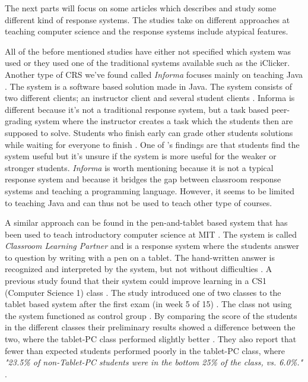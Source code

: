 The next parts will focus on some articles which describes and study some different kind of response systems. The studies take on different approaches at teaching computer science and the response systems include atypical features.

All of the before mentioned studies have either not specified which system was used or they used one of the traditional systems available such as the iClicker. Another type of CRS we've found called \emph{Informa} focuses mainly on teaching Java \cite{Hauswirth09}. The system is a software based solution made in Java. The system consists of two different clients; an instructor client and several student clients \cite[p.~1]{Hauswirth09}. Informa is different because it's not a traditional response system, but a task based peer-grading system where the instructor creates a task which the students then are supposed to solve. Students who finish early can grade other students solutions while waiting for everyone to finish \cite{Hauswirth09}. One of 's findings are that students find the system useful but it's unsure if the system is more useful for the weaker or stronger students. \emph{Informa} is worth mentioning because it is not a typical response system and because it bridges the gap between classroom response systems and teaching a programming language. However, it seems to be limited to teaching Java and can thus not be used to teach other type of courses.

A similar approach can be found in the pen-and-tablet based system that has been used to teach introductory computer science at MIT \cite{koile2007supporting}. The system is called \emph{Classroom Learning Partner} and is a response system where the students answer to question by writing with a pen on a tablet. The hand-written answer is recognized and interpreted by the system, but not without difficulties \cite[pp.~2-3]{koile2007supporting}. A previous study found that their system could improve learning in a CS1 (Computer Science 1) class \cite{koile2006improving}. The study introduced one of two classes to the tablet based system after the first exam (in week 5 of 15) \cite[pp.~6-7]{koile2006improving}. The class not using the system functioned as control group \cite[pp.~6-7]{koile2006improving}. By comparing the score of the students in the different classes their preliminary results showed a difference between the two, where the tablet-PC class performed slightly better \cite{koile2006improving}. They also report that fewer than expected students performed poorly in the tablet-PC class, where \emph{"23.5\% of non-Tablet-PC students were in the bottom 25\% of the class, vs. 6.0\%."} \cite[p.~7]{koile2006improving}. %